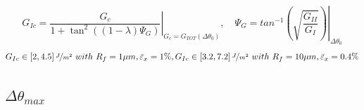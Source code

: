 \documentclass[first,firstsupp,lastsupp,last,hyperref,table]{ETHclass}
\begin{document}
\begin{frame}
\begin{columns}[c]
\begin{column}{0.5\textwidth}
\begin{figure}
\end{figure}
\end{column}
\end{columns}
\vspace{-0.2cm}
\scriptsize
\begin{equation*}
G_{Ic}=\left.\frac{G_{c}}{1+\tan^{2}\left(\left(1-\lambda\right)\Psi_{G}\right)}\right|_{G_{c}=G_{TOT}\left(\Delta\theta_{0}\right)},\quad\Psi_{G}=\left.tan^{-1}\left(\sqrt{\frac{G_{II}}{G_{I}}}\right)\right|_{\Delta\theta_{0}}
\end{equation*}
\begin{equation*}
G_{Ic}\in\left[2,4.5\right]\nicefrac{J}{m^{2}}\ with\ R_{f}=1\mu m,\bar{\varepsilon}_{x}=1\%, G_{Ic}\in\left[3.2,7.2\right]\nicefrac{J}{m^{2}}\ with\ R_{f}=10\mu m,\bar{\varepsilon}_{x}=0.4\%
\end{equation*}
\end{frame}

\subsection{$\Delta\theta_{max}$}
\end{document}
